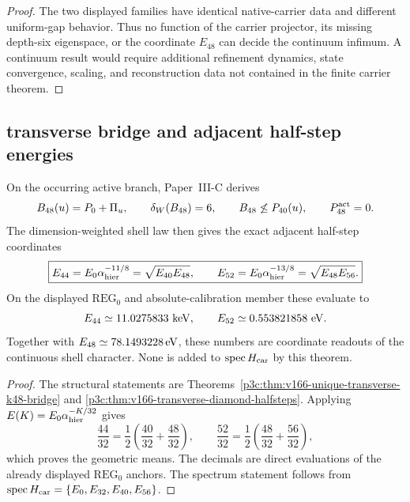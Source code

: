 \documentclass[12pt,a4paper]{article}
\begin{document}
\begin{proof}
The two displayed families have identical native-carrier data and different
uniform-gap behavior.  Thus no function of the carrier projector, its missing
depth-six eigenspace, or the coordinate \(E_{48}\) can decide the continuum
infimum.  A continuum result would require additional refinement dynamics,
state convergence, scaling, and reconstruction data not contained in the
finite carrier theorem.
\end{proof}

\subsection{transverse bridge and adjacent half-step energies}
\label{p6:sec:v166-transverse-bridge-halfstep-energies}

\begin{theorem}
\label{p6:thm:v166-e44-e48-e52-structural-coordinates}
On the occurring active branch, Paper~III-C derives
\[
 B_{48}(u)=P_0+\Pi_u,
 \qquad
 \delta_W(B_{48})=6,
 \qquad
 B_{48}\not\le P_{40}(u),
 \qquad
 P_{48}^{\rm act}=0.
\]
The dimension-weighted shell law then gives the exact adjacent half-step
coordinates
\begin{equation}
 \label{p6:eq:v166-e44-e52-geometric-midpoints}
 \boxed{
 E_{44}=E_0\alpha_{\rm hier}^{-11/8}
       =\sqrt{E_{40}E_{48}},
 \qquad
 E_{52}=E_0\alpha_{\rm hier}^{-13/8}
       =\sqrt{E_{48}E_{56}}.}
\end{equation}
On the displayed \(\mathrm{REG}_0\) and absolute-calibration member these
evaluate to
\begin{equation}
 \label{p6:eq:v166-e44-e52-numerical-coordinates}
 E_{44}\simeq11.0275833\ {\rm keV},
 \qquad
 E_{52}\simeq0.553821858\ {\rm eV}.
\end{equation}
Together with \(E_{48}\simeq78.1493228\,{\rm eV}\), these numbers are
coordinate readouts of the continuous shell character.  None is added to
\(\operatorname{spec}H_{\rm car}\) by this theorem.
\end{theorem}

\begin{proof}
The structural statements are
Theorems~\ref{p3c:thm:v166-unique-transverse-k48-bridge} and
\ref{p3c:thm:v166-transverse-diamond-halfsteps}.  Applying
\(E(K)=E_0\alpha_{\rm hier}^{-K/32}\) gives
\[
 \frac{44}{32}=\frac12\left(\frac{40}{32}+\frac{48}{32}\right),
 \qquad
 \frac{52}{32}=\frac12\left(\frac{48}{32}+\frac{56}{32}\right),
\]
which proves the geometric means.  The decimals are direct evaluations of
the already displayed \(\mathrm{REG}_0\) anchors.  The spectrum statement
follows from
\(\operatorname{spec}H_{\rm car}=\{E_0,E_{32},E_{40},E_{56}\}\).
\end{proof}
\end{document}
